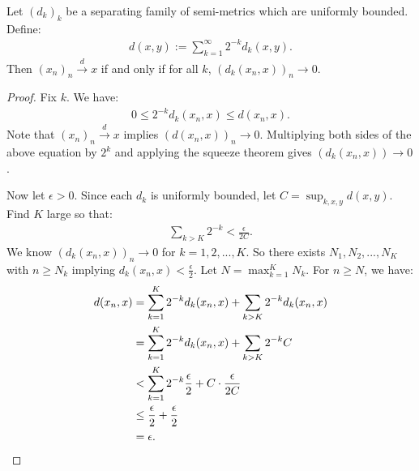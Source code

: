     \begin{proposition}
        Let $(d_k)_k$ be a separating family of semi-metrics which are uniformly bounded. Define:
            \begin{equation*}
            \begin{split}
                d(x,y) := \sum_{k = 1}^\infty 2^{-k}d_k(x,y).
            \end{split}
            \end{equation*}
        Then $(x_n)_n \xrightarrow{d} x$ if and only if for all $k$, $(d_k(x_n,x))_n \rightarrow 0$.
    \end{proposition}
        \begin{proof}
            Fix $k$. We have:
                \begin{equation*}
                \begin{split}
                    0 \leq 2^{-k}d_k(x_n,x) \leq d(x_n,x).
                \end{split}
                \end{equation*}
            Note that $(x_n)_n \xrightarrow{d} x$ implies $(d(x_n,x))_n \rightarrow 0$. Multiplying both sides of the above equation by $2^k$ and applying the squeeze theorem gives $(d_k(x_n,x)) \rightarrow 0$.

            Now let $\epsilon > 0$. Since each $d_k$ is uniformly bounded, let $C = \sup_{k,x,y}d(x,y)$. Find $K$ large so that:
                \begin{equation*}
                \begin{split}
                    \sum_{k > K}2^{-k} < \frac{\epsilon}{2C}.
                \end{split}
                \end{equation*}
            We know $(d_k(x_n,x))_n \rightarrow 0$ for $k = 1,2,...,K$. So there exists $N_1,N_2,...,N_K$ with $n \geq N_k$ implying $d_k(x_n,x) < \frac{\epsilon}{2}$. Let $N = \max_{k = 1}^K N_k$. For $n \geq N$, we have:
                \begin{equation*}
                \begin{split}
                    d(x_n,x) 
                    & = \sum_{k = 1}^K 2^{-k}d_k(x_n,x) + \sum_{k > K}2^{-k}d_k(x_n,x) \\
                    & = \sum_{k = 1}^K 2^{-k}d_k(x_n,x) + \sum_{k > K}2^{-k} C \\
                    & < \sum_{k = 1}^K 2^{-k} \frac{\epsilon}{2} + C \cdot \frac{\epsilon}{2C} \\
                    & \leq \frac{\epsilon}{2} + \frac{\epsilon}{2} \\
                    & = \epsilon. \qedhere
                \end{split}
                \end{equation*}
        \end{proof}

